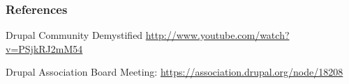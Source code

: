 \begin{frame}
\frametitle{References}


\begin{itemize}
\tiny{
\item Drupal Community Demystified
\url{http://www.youtube.com/watch?v=PSjkRJ2mM54}

\item Drupal Association Board Meeting:
\url{https://association.drupal.org/node/18208}

} %
\end{itemize}


\end{frame}
